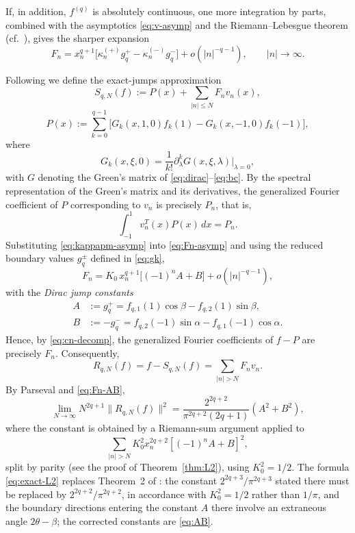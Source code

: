 \documentclass[11pt,a4paper]{article}
\theoremstyle{definition}
\begin{document}
If, in addition, $f^{(q)}$ is absolutely continuous, one
more integration by parts, combined with the asymptotics
\eqref{eq:v-asymp} and the Riemann--Lebesgue theorem (cf.\
\cite{Bdirac}), gives the sharper expansion
\begin{equation}\label{eq:Fn-asymp}
F_n=x_n^{q+1}\bigl[\kappa_n^{(+)}g_q^+-\kappa_n^{(-)}g_q^-\bigr]+o(|n|^{-q-1}),
\qquad |n|\to\infty.
\end{equation}

Following \cite{Bdirac} we define the exact-jumps approximation
\begin{equation}\label{eq:Sqn-exact}
S_{q,N}(f) := P(x) + \sum_{|n|\le N} F_n v_n(x),
\end{equation}
\begin{equation*}
P(x):=\sum_{k=0}^{q-1}\bigl[G_k(x,1,0)f_k(1)-G_k(x,-1,0)f_k(-1)\bigr],
\end{equation*}
where
\[
G_k(x,\xi,0)
=
\frac{1}{k!}\partial_\lambda^k G(x,\xi,\lambda)
\big|_{\lambda=0},
\]
with $G$ denoting the Green's matrix of
\eqref{eq:dirac}--\eqref{eq:bc}. By the spectral representation of the Green's matrix and its
derivatives, the generalized Fourier coefficient of $P$ corresponding
to $v_n$ is precisely $P_n$, that is,
\[
\int_{-1}^{1}v_n^T(x)P(x)\,dx=P_n.
\]
Substituting \eqref{eq:kappapm-asymp} into \eqref{eq:Fn-asymp} and using
the reduced boundary values $g_q^\pm$ defined in \eqref{eq:gk},
\begin{equation}\label{eq:Fn-AB}
F_n=K_0\,x_n^{q+1}\bigl[(-1)^n A+B\bigr]+o(|n|^{-q-1}),
\end{equation}
with the \emph{Dirac jump constants}
\begin{equation}\label{eq:AB}
\begin{aligned}
A&:=g_q^+ = f_{q,1}(1)\cos\beta - f_{q,2}(1)\sin\beta,\\
B&:=-g_q^- = f_{q,2}(-1)\sin\alpha - f_{q,1}(-1)\cos\alpha.
\end{aligned}
\end{equation}
Hence, by \eqref{eq:cn-decomp}, the generalized Fourier coefficients of
$f-P$ are precisely $F_n$. Consequently,
\[
R_{q,N}(f)
=
f-S_{q,N}(f)
=
\sum_{|n|>N}F_n v_n.
\]
By Parseval and \eqref{eq:Fn-AB},
\begin{equation}\label{eq:exact-L2}
\lim_{N\to\infty}N^{2q+1}\|R_{q,N}(f)\|^2
=\frac{2^{2q+2}}{\pi^{2q+2}(2q+1)}(A^2+B^2),
\end{equation}
where the constant is obtained by a Riemann-sum argument applied to
$$\sum_{|n|>N}K_0^2 x_n^{2q+2}[(-1)^nA+B]^2,$$ split by parity (see
the proof of Theorem~\ref{thm:L2}), using $K_0^2=1/2$. The formula
\eqref{eq:exact-L2} replaces Theorem~2 of \cite{Bdirac}: the constant
$2^{2q+3}/\pi^{2q+3}$ stated there must be replaced by
$2^{2q+2}/\pi^{2q+2}$, in accordance with $K_0^2=1/2$ rather than
$1/\pi$, and the boundary directions entering the constant $A$ there
involve an extraneous angle $2\theta-\beta$; the corrected
constants are \eqref{eq:AB}.
\end{document}
